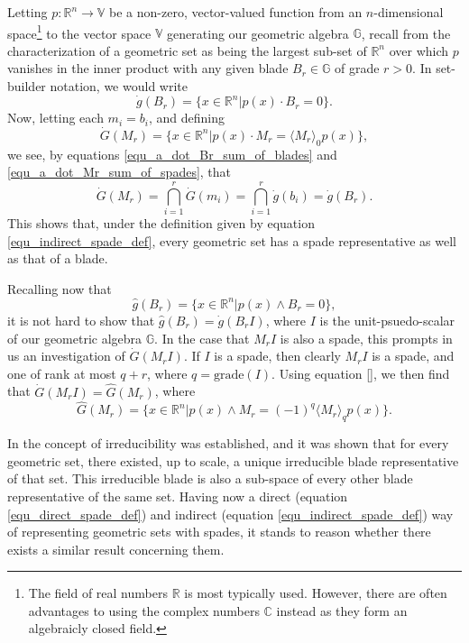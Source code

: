 \documentclass{birkjour}
\theoremstyle{definition}
\theoremstyle{remark}
\numberwithin{equation}{section}
\newcommand{\R}{\mathbb{R}}
\newcommand{\C}{\mathbb{C}}
\newcommand{\G}{\mathbb{G}}
\newcommand{\V}{\mathbb{V}}
\newcommand{\gd}{\dot{g}}
\newcommand{\gh}{\hat{g}}
\newcommand{\Gd}{\dot{G}}
\newcommand{\Gh}{\hat{G}}
\newcommand{\grade}{\mbox{grade}}
\begin{document}
Letting $p:\R^n\to\V$ be a non-zero, vector-valued function from an $n$-dimensional space\footnote{The field of real numbers $\R$ is most typically used.
However, there are often advantages to using the complex numbers $\C$ instead as they form an algebraicly closed field.} to the vector
space $\V$ generating our geometric algebra $\G$, recall from \cite{Parkin15} the characterization of a geometric set as being the largest sub-set of $\R^n$
over which $p$ vanishes in the inner product with any given blade $B_r\in\G$ of grade $r>0$.  In set-builder notation, we would write
\begin{equation*}\label{equ_indirect_blade_def}
\gd(B_r) = \{x\in\R^n|p(x)\cdot B_r=0\}.
\end{equation*}
Now, letting each $m_i=b_i$, and defining
\begin{equation}\label{equ_indirect_spade_def}
\Gd(M_r) = \{x\in\R^n|p(x)\cdot M_r=\langle M_r\rangle_0p(x)\},
\end{equation}
we see, by equations \eqref{equ_a_dot_Br_sum_of_blades} and \eqref{equ_a_dot_Mr_sum_of_spades}, that
\begin{equation*}\label{equ_direct_blade_def}
\Gd(M_r) = \bigcap_{i=1}^r\Gd(m_i) = \bigcap_{i=1}^r\gd(b_i) = \gd(B_r).
\end{equation*}
This shows that, under the definition given by equation \eqref{equ_indirect_spade_def}, every geometric set has a spade representative as well as that of a blade.

Recalling now that
\begin{equation}\label{equ_direct_blade_def}
\gh(B_r) = \{x\in\R^n|p(x)\wedge B_r=0\},
\end{equation}
it is not hard to show that $\gh(B_r)=\gd(B_rI)$,
where $I$ is the unit-psuedo-scalar of our geometric algebra $\G$.
In the case that $M_rI$ is also a spade, this prompts in us an investigation of $\Gd(M_rI)$.
If $I$ is a spade, then clearly $M_rI$ is a spade, and one of rank at most $q+r$, where $q=\grade(I)$.
Using equation \eqref{}, we then find that $\Gd(M_rI)=\Gh(M_r)$, where
\begin{equation}\label{equ_direct_spade_def}
\Gh(M_r) = \{x\in\R^n|p(x)\wedge M_r=(-1)^q\langle M_r\rangle_q p(x)\}.
\end{equation}

In \cite{Parkin15} the concept of irreducibility was established, and it was shown that for every
geometric set, there existed, up to scale, a unique irreducible blade representative of that set.
This irreducible blade is also a sub-space of every other blade representative of the same set.
Having now a direct (equation \eqref{equ_direct_spade_def}) and indirect (equation \eqref{equ_indirect_spade_def}) way of representing geometric sets with spades,
it stands to reason whether there exists a similar result concerning them.
\end{document}
